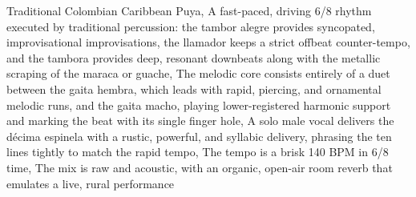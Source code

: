 
\begin{notes}
\end{notes}
\begin{style}
Traditional Colombian Caribbean Puya, A fast-paced, driving 6/8 rhythm executed by traditional percussion: the tambor alegre provides syncopated, improvisational improvisations, the llamador keeps a strict offbeat counter-tempo, and the tambora provides deep, resonant downbeats along with the metallic scraping of the maraca or guache, The melodic core consists entirely of a duet between the gaita hembra, which leads with rapid, piercing, and ornamental melodic runs, and the gaita macho, playing lower-registered harmonic support and marking the beat with its single finger hole, A solo male vocal delivers the décima espinela with a rustic, powerful, and syllabic delivery, phrasing the ten lines tightly to match the rapid tempo, The tempo is a brisk 140 BPM in 6/8 time, The mix is raw and acoustic, with an organic, open-air room reverb that emulates a live, rural performance
\end{style}
